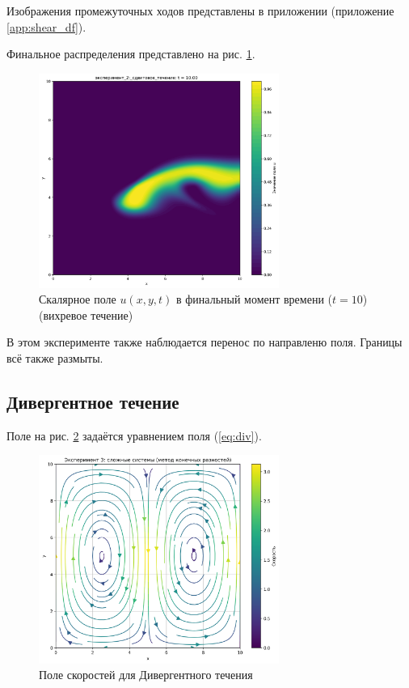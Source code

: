 Изображения промежуточных ходов представлены в приложении (приложение \ref{app:shear_df}).

Финальное распределения представлено на рис. \ref{fig:shear_final}.

\begin{figure}
	\centering
	\includegraphics[width=0.7\textwidth]{imgs/эксперимент_2:_сдвиговое_течение_t10.00.png}
	\caption{Скалярное поле \(u(x,y,t)\) в финальный момент времени ($t=10$) (вихревое течение)}
	\label{fig:shear_final}
\end{figure}

\newpage
В этом эксперименте также наблюдается перенос по направленю поля. Границы всё также размыты.

\newpage
\subsection{Дивергентное течение}
Поле на рис. \ref{fig:div_velocity} задаётся уравнением поля (\ref{eq:div}).
\begin{figure}[h]
	\centering
	\includegraphics[width=0.7\textwidth]{imgs/эксперимент_3:_сложные_системы_fd_velocity_field.png}
	\caption{Поле скоростей для Дивергентного течения}
	\label{fig:div_velocity}
\end{figure}

